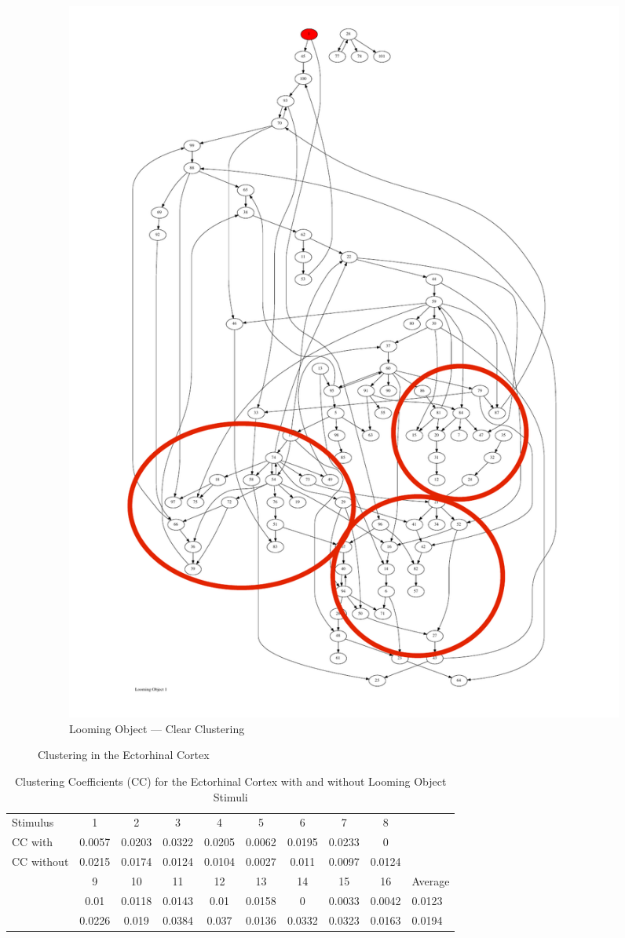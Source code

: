 \documentclass{article}
\begin{document}
\begin{figure}[H]
\begin{subfigure}{0.3\textwidth}
    \includegraphics[width=\textwidth]{loom_obj_clusters}
    \caption{Looming Object --- Clear Clustering}
    \label{fig:loom_clusters}
  \end{subfigure}

  \caption{Clustering in the Ectorhinal Cortex}
  \label{fig:ecto_clusters}
\end{figure}

\begin{table}[ht]
  \centering
  \footnotesize

  \begin{tabular}{l|c|c|c|c|c|c|c|c|l}
    \hline
    Stimulus         & 1 & 2 & 3 & 4 & 5 & 6 & 7 & 8 & \\ 
    CC with   & 0.0057 & 0.0203 & 0.0322&0.0205&0.0062&0.0195&0.0233&0 & \\
    CC without&0.0215&0.0174&0.0124&0.0104&0.0027&0.011&0.0097&0.0124 & \\
    \hline
    & 9 & 10 & 11 & 12 & 13 & 14 & 15 & 16 & Average \\
    & 0.01&0.0118&0.0143&0.01&0.0158&0&0.0033&0.0042&0.0123\\
    & 0.0226&0.019&0.0384&0.037&0.0136&0.0332&0.0323&0.0163&0.0194\\
    \hline
  \end{tabular}

  \caption{Clustering Coefficients (CC) for the Ectorhinal Cortex with and without Looming Object Stimuli}
  \label{tab:ecto_clusters}
\end{table}
\end{document}
